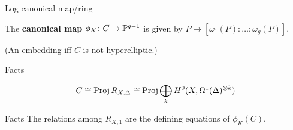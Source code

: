 \begin{frame}{Log canonical map/ring}


  \begin{definition}
    The \textbf{canonical map} $\phi_K\colon C \to \P^{g-1}$ is given by $P
    \mapsto [\omega_1(P):\ldots:\omega_g(P)]$.
  \end{definition}

(An embedding iff $C$ is not hyperelliptic.)

  \begin{block}{Facts}

\[C \cong \Proj R_{X,\Delta} \cong  \Proj  \bigoplus_k H^0(X, \Omega^1(\Delta)^{\otimes k}) \]

  \end{block}
  \begin{block}{Facts}
The relations among $R_{X,1}$ are the defining equations of $\phi_K(C)$.
  \end{block}



\end{frame}
